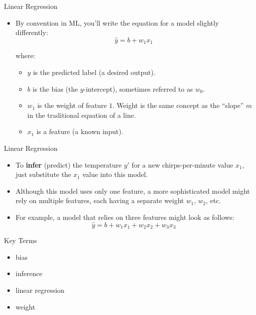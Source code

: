 \documentclass{beamer}
\begin{document}

\begin{frame}{Linear Regression}
\begin{itemize}
\item By convention in ML, you'll write the equation for a model slightly differently:
$$\hat{y} = b + w_1 x_1$$

where:

\medskip
\begin{itemize}
\item $y$ is the predicted label (a desired output).

\medskip
\item $b$ is the bias (the $y$-intercept), sometimes referred to as $w_0$.

\medskip
\item $w_1$ is the weight of feature $1$. Weight is the same concept as the ``slope'' $m$ in the traditional equation of a line.

\medskip
\item $x_1$ is a feature (a known input).
\end{itemize}
\end{itemize}
\end{frame}


\begin{frame}{Linear Regression}
\begin{itemize}
\item To {\bf infer} (predict) the temperature $y'$ for a new chirps-per-minute value $x_1$, just substitute the $x_1$ value into this model.

\medskip    
\item Although this model uses only one feature, a more sophisticated model might rely on multiple features, each having a separate weight $w_1$, $w_2$, etc. 

\medskip    
\item For example, a model that relies on three features might look as follows:
$$ \hat{y} = b + w_1 x_1 + w_2 x_2 + w_3 x_3 $$
\end{itemize}
\end{frame}


\begin{frame}{Key Terms}
\begin{itemize}
    \item bias
    \item inference
    \item linear regression
    \item weight
\end{itemize}
\end{frame}
\end{document}
